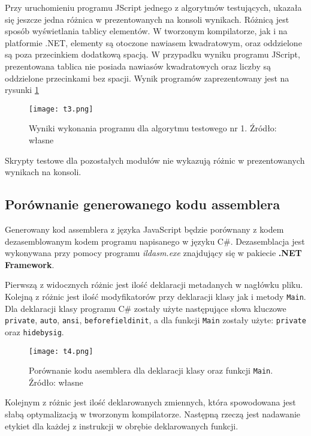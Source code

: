 \par Przy uruchomieniu programu JScript jednego z algorytmów testujących, ukazała się jeszcze jedna różnica w prezentowanych na konsoli wynikach. Różnicą jest sposób wyświetlania tablicy elementów. W tworzonym kompilatorze, jak i na platformie .NET, elementy są otoczone nawiasem kwadratowym, oraz oddzielone są poza przecinkiem dodatkową spacją. W przypadku wyniku programu JScript, prezentowana tablica nie posiada nawiasów kwadratowych oraz liczby są oddzielone przecinkami bez spacji. Wynik programów zaprezentowany jest na rysunki \ref{fig:result3}

\begin{figure}[!h]
	\centering
  \texttt{[image: t3.png]}
	\caption{Wyniki wykonania programu dla algorytmu testowego nr 1. Źródło: własne}
	\label{fig:result3}
\end{figure}

\par Skrypty testowe dla pozostałych modułów nie wykazują różnic w prezentowanych wynikach na konsoli.

\subsection{Porównanie generowanego kodu assemblera}

\par Generowany kod assemblera z języka JavaScript będzie porównany z kodem dezasemblowanym kodem programu napisanego w języku C\#. Dezasemblacja jest wykonywana przy pomocy programu \textit{ildasm.exe} znajdujący się w pakiecie \textbf{.NET Framework}.
\par Pierwszą z widocznych różnic jest ilość deklaracji metadanych w nagłówku pliku. Kolejną z różnic jest ilość modyfikatorów przy deklaracji klasy jak i metody \texttt{Main}. Dla deklaracji klasy programu C\# zostały użyte następujące słowa kluczowe \texttt{private}, \texttt{auto}, \texttt{ansi}, \texttt{beforefieldinit}, a dla funkcji \texttt{Main} zostały użyte: \texttt{private} oraz \texttt{hidebysig}. 

\begin{figure}[!h]
	\centering
  \texttt{[image: t4.png]}
	\caption{Porównanie kodu asemblera dla deklaracji klasy oraz funkcji \texttt{Main}. Źródło: własne}
	\label{fig:result4}
\end{figure}

\par Kolejnym z różnic jest ilość deklarowanych zmiennych, która spowodowana jest słabą optymalizacją w tworzonym kompilatorze. Następną rzeczą jest nadawanie etykiet dla każdej z instrukcji w obrębie deklarowanych funkcji. 

